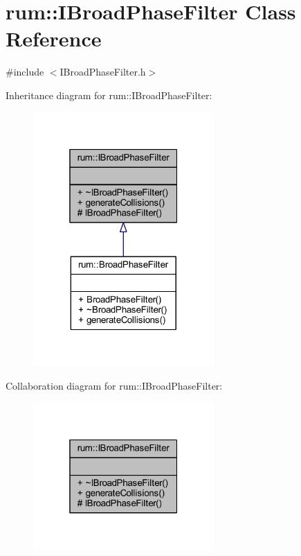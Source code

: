 \hypertarget{classrum_1_1_i_broad_phase_filter}{}\section{rum\+:\+:I\+Broad\+Phase\+Filter Class Reference}
\label{classrum_1_1_i_broad_phase_filter}


{\ttfamily \#include $<$I\+Broad\+Phase\+Filter.\+h$>$}



Inheritance diagram for rum\+:\+:I\+Broad\+Phase\+Filter\+:\nopagebreak
\begin{figure}[H]
\begin{center}
\leavevmode
\includegraphics[width=196pt]{classrum_1_1_i_broad_phase_filter__inherit__graph}
\end{center}
\end{figure}


Collaboration diagram for rum\+:\+:I\+Broad\+Phase\+Filter\+:\nopagebreak
\begin{figure}[H]
\begin{center}
\leavevmode
\includegraphics[width=196pt]{classrum_1_1_i_broad_phase_filter__coll__graph}
\end{center}
\end{figure}
